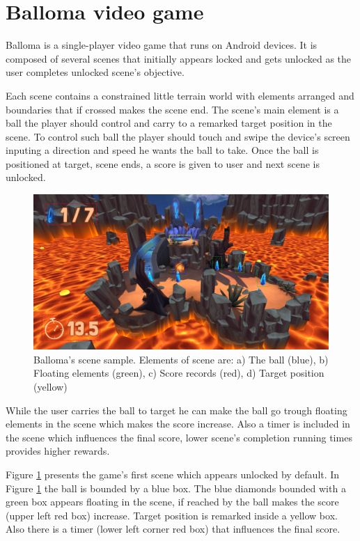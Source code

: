 \documentclass[peerreview,onecolumn]{IEEEtran}
\begin{document}
\section{Balloma video game}
  
   Balloma is a single-player video game that runs on Android devices. It is composed of several scenes that initially appears locked and gets unlocked as the user completes unlocked scene's objective. 
   
   Each scene contains a constrained little terrain world with elements arranged and boundaries that if crossed makes the scene end. The scene's main element is a ball the player should control and carry to a remarked target position in the scene. To control such ball the player should touch and swipe the device's screen inputing a direction and speed he wants the ball to take. Once the ball is positioned at target, scene ends, a score is given to user and next scene is unlocked. 
   
   \begin{figure}[!h]
		\centering
		\includegraphics[width=0.9\columnwidth]{img/balloma_scene.jpg} 
		\caption{Balloma's scene sample. Elements of scene are: a) The ball (blue), b) Floating elements (green), c) Score records (red), d) Target position (yellow)}
		\label{fig_scene}
	\end{figure}
   
   While the user carries the ball to target he can make the ball go trough floating elements in the scene which makes the score increase. Also a timer is included in the scene which influences the final score, lower scene's completion running times provides higher rewards.
   
   Figure \ref{fig_scene} presents the game's first scene which appears unlocked by default. In Figure \ref{fig_scene} the ball is bounded by a blue box. The blue diamonds bounded with a green box appears floating in the scene, if reached by the ball makes the score (upper left red box) increase. Target position is remarked inside a yellow box. Also there is a timer (lower left corner red box) that influences the final score.
   
\end{document}
